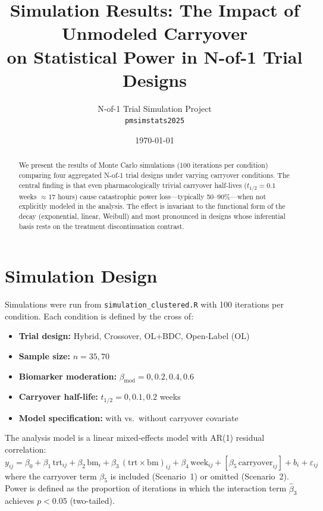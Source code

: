 \documentclass[11pt]{article}
\title{Simulation Results: The Impact of Unmodeled Carryover\\
on Statistical Power in N-of-1 Trial Designs}
\author{N-of-1 Trial Simulation Project\\
\texttt{pmsimstats2025}}
\date{\today}
\begin{document}
\maketitle

\begin{abstract}
We present the results of Monte Carlo simulations
(100 iterations per condition) comparing four aggregated
N-of-1 trial designs under varying carryover conditions.
The central finding is that even pharmacologically trivial
carryover half-lives ($t_{1/2} = 0.1$ weeks $\approx 17$ hours)
cause catastrophic power loss---typically 50--90\%---when not
explicitly modeled in the analysis.
The effect is invariant to the functional form of the decay
(exponential, linear, Weibull) and most pronounced in designs
whose inferential basis rests on the treatment discontinuation
contrast.
\end{abstract}

\tableofcontents
\newpage

\section{Simulation Design}

Simulations were run from
\texttt{simulation\_clustered.R} with 100 iterations per
condition.
Each condition is defined by the cross of:

\begin{itemize}[nosep]
  \item \textbf{Trial design:} Hybrid, Crossover,
        OL+BDC, Open-Label (OL)
  \item \textbf{Sample size:} $n = 35, 70$
  \item \textbf{Biomarker moderation:}
        $\beta_{\mathrm{mod}} = 0, 0.2, 0.4, 0.6$
  \item \textbf{Carryover half-life:}
        $t_{1/2} = 0, 0.1, 0.2$ weeks
  \item \textbf{Model specification:} with vs.\ without
        carryover covariate
\end{itemize}

\noindent
The analysis model is a linear mixed-effects model with
AR(1) residual correlation:
%
\begin{equation}
  y_{ij} = \beta_0 + \beta_1 \,\mathrm{trt}_{ij}
         + \beta_2 \,\mathrm{bm}_i
         + \beta_3 \,(\mathrm{trt} \times \mathrm{bm})_{ij}
         + \beta_4 \,\mathrm{week}_{ij}
         + [\beta_5 \,\mathrm{carryover}_{ij}]
         + b_i + \varepsilon_{ij}
\label{eq:model}
\end{equation}
%
where the carryover term $\beta_5$ is included (Scenario~1)
or omitted (Scenario~2).
Power is defined as the proportion of iterations in which
the interaction term
$\hat{\beta}_3$ achieves $p < 0.05$ (two-tailed).
\end{document}
